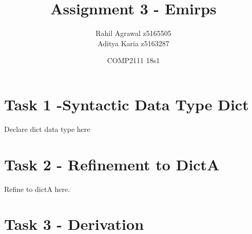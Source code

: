 \documentclass[a4paper,12pt,fleqn]{scrartcl}
\title{Assignment 3 - Emirps}
\date{COMP2111 18s1}
\author{Rahil Agrawal z5165505\\Aditya Karia z5163287}
\begin{document}
\maketitle
{}

\section{Task 1 -Syntactic Data Type Dict}
\label{sec:task-1}
Declare dict data type here
\pagebreak
\section{Task 2 - Refinement to DictA}
\label{sec:task-2}
Refine to dictA here.
\pagebreak
\section{Task 3 - Derivation}
\label{sec:task-3}
\end{document}
